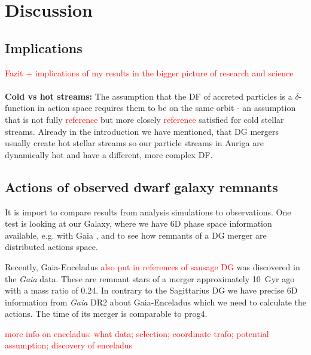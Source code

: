 \section{Discussion} \label{sec:Discussion}
\subsection{Implications}
\textcolor{red}{Fazit + implications of my results in the bigger picture of research and science}
\\\\\textbf{Cold vs hot streams:}
The assumption that the \ac{DF} of accreted particles is a $\delta$-function in action space requires them to be on the same orbit - an assumption that is not fully \textcolor{red}{reference} but more closely \textcolor{red}{reference} satisfied for cold stellar streams. Already in the introduction we have mentioned, that \ac{DG} mergers usually create hot stellar streams so our particle streams in Auriga are dynamically hot and have a different, more complex \ac{DF}.

\subsection{Actions of observed dwarf galaxy remnants}
It is import to compare results from analysis simulations to observations. One test is looking at our Galaxy, where we have 6D phase space information available, e.g. with Gaia \citep{Gaia...mission...2016, GaiaDR2...overview...2018}, and to see how remnants of a \ac{DG} merger are distributed actions space.

Recently, Gaia-Enceladus \citep{Enceladus....Helmi...2018} \textcolor{red}{also put in references of sausage DG} was discovered in the \textit{Gaia} data. These are remnant stars of a merger approximately \SI{10}{Gyr} ago with a mass ratio of 0.24. In contrary to the Sagittarius \ac{DG} we have precise 6D information from \textit{Gaia} DR2 about Gaia-Enceladus which we need to calculate the actions. The time of its merger is comparable to prog4. 

\textcolor{red}{more info on enceladus: what data; selection; coordinate trafo; potential assumption; discovery of enceladus}

